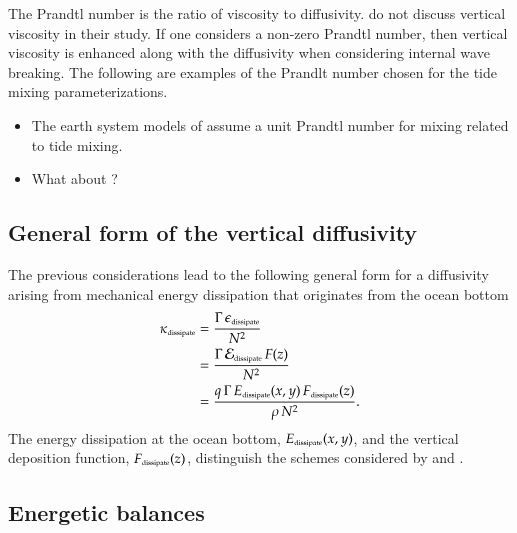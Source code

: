 The Prandtl number is the ratio of viscosity to diffusivity.
\cite{Simmonsetal2004} do not discuss vertical viscosity in their
study.  If one considers a non-zero Prandtl number, then vertical
viscosity is enhanced along with the diffusivity when considering
internal wave breaking.  The following are examples of the Prandlt
number chosen for the tide mixing parameterizations.
\begin{itemize}

\item The earth system models of \cite{Dunne_etal_part1_2012} assume a
  unit Prandtl number for mixing related to tide mixing.

\item What about \cite{Jayne2009}?  

\end{itemize}


\subsection{General form of the vertical diffusivity}
\label{subsection:general-form-tide-diffusivity}

The previous considerations lead to the following general form for a
diffusivity arising from mechanical energy dissipation that originates
from the ocean bottom
\begin{subequations}
\begin{align}
 \kappa_{\mbox{\tiny dissipate}} &= 
 \frac{\Gamma \, \epsilon_{\mbox{\tiny dissipate}}}{N^{2}}
\\
 &=\frac{\Gamma \, {\cal E}_{\mbox{\tiny dissipate}} \, F(z) }{N^{2}}
\\
 &=
 \frac{q \, \Gamma \, E_{\mbox{\tiny dissipate}}(x,y) \,  F_{\mbox{\tiny dissipate}}(z)}  {\rho \, N^2}.
\end{align}
\label{eq:wave-vert-kappa-general-bottom}
\end{subequations}
The energy dissipation at the ocean bottom, $ E_{\mbox{\tiny
    dissipate}}(x,y)$, and the vertical deposition function,
$F_{\mbox{\tiny dissipate}}(z)$, distinguish the schemes considered by
\cite{Simmonsetal2004} and \cite{Melet_etal_2013}.


\subsection{Energetic balances}

